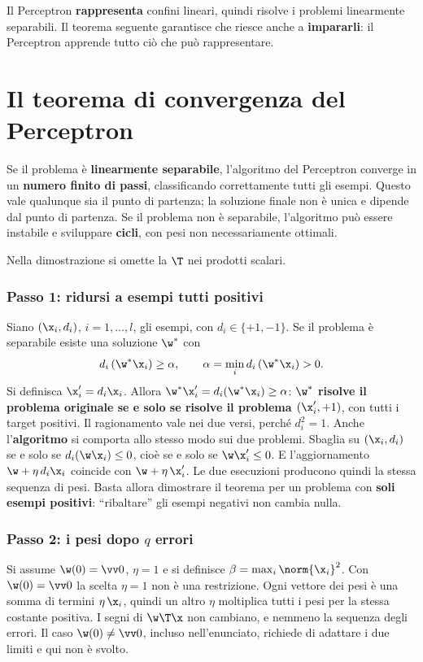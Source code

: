 Il Perceptron \textbf{rappresenta} confini lineari, quindi risolve i problemi linearmente separabili. Il teorema
seguente garantisce che riesce anche a \textbf{impararli}: il Perceptron apprende tutto ciò che può rappresentare.

\section{Il teorema di convergenza del Perceptron}
\label{sec:convergenza-perceptron}

\begin{teorema}
Se il problema è \textbf{linearmente separabile}, l'algoritmo del Perceptron converge in un \textbf{numero finito
di passi}, classificando correttamente tutti gli esempi. Questo vale qualunque sia il punto di partenza; la
soluzione finale non è unica e dipende dal punto di partenza. Se il problema non è separabile, l'algoritmo può
essere instabile e sviluppare \textbf{cicli}, con pesi non necessariamente ottimali.
\end{teorema}

Nella dimostrazione si omette la $\T$ nei prodotti scalari.

\subsubsection{Passo 1: ridursi a esempi tutti positivi}
Siano $(\x_i,d_i)$, $i=1,\dots,l$, gli esempi, con $d_i\in\{+1,-1\}$. Se il problema è separabile esiste una
soluzione $\w^*$ con
\[
d_i\,(\w^*\x_i)\ge\alpha,\qquad \alpha = \min_i d_i\,(\w^*\x_i) > 0 .
\]
Si definisca $\x'_i = d_i\x_i$. Allora $\w^*\x'_i = d_i(\w^*\x_i)\ge\alpha$: \textbf{$\w^*$ risolve il problema
originale se e solo se risolve il problema $(\x'_i,+1)$}, con tutti i target positivi. Il ragionamento vale nei
due versi, perché $d_i^2=1$. Anche l'\textbf{algoritmo} si comporta allo stesso modo sui due problemi. Sbaglia
su $(\x_i,d_i)$ se e solo se $d_i(\w\x_i)\le0$, cioè se e solo se $\w\x'_i\le0$. E l'aggiornamento
$\w+\eta\,d_i\x_i$ coincide con $\w+\eta\,\x'_i$. Le due esecuzioni producono quindi la stessa sequenza di pesi.
Basta allora dimostrare il teorema per un problema con \textbf{soli esempi positivi}: ``ribaltare'' gli esempi
negativi non cambia nulla.

\subsubsection{Passo 2: i pesi dopo $q$ errori}
Si assume $\w(0) = \vv0$, $\eta=1$ e si definisce $\beta = \max_i\norm{\x_i}^2$. Con $\w(0)=\vv0$ la scelta
$\eta=1$ non è una restrizione. Ogni vettore dei pesi è una somma di termini $\eta\,\x_i$, quindi un altro $\eta$
moltiplica tutti i pesi per la stessa costante positiva. I segni di $\w\T\x$ non cambiano, e nemmeno la sequenza
degli errori. Il caso $\w(0)\neq\vv0$, incluso nell'enunciato, richiede di adattare i due limiti e qui non
è svolto.

